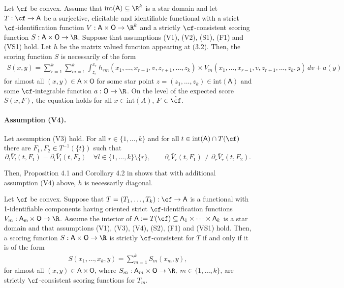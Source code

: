 \begin{prop}
Let $\cf$ be convex. Assume that $\mathrm{int}(\mathsf{A}) \subseteq \R^k$ is a star domain and let $T: \cf \to \mathsf{A}$ be a surjective, elicitable and identifiable functional with a strict $\cf$-identification function $V: \mathsf{A} \times \mathsf{O} \to \R^k$ and a strictly $\cf$-consistent scoring function $S: \mathsf{A} \times \mathsf{O} \to \R$. Suppose that assumptions (V1), (V2), (S1), (F1) and (VS1) hold. Let $h$ be the matrix valued function appearing at (3.2). Then, the scoring function $S$ is necessarily of the form
\begin{align}
S(x, y) = \sum_{r=1}^{k} \sum_{m=1}^{k} \int_{z_r}^{x_r} h_{rm}(x_1, \ldots, x_{r-1}, v, z_{r+1}, \ldots, z_k) \times V_m(x_1, \ldots, x_{r-1}, v, z_{r+1}, \ldots, z_k, y) \, dv + a(y)
\end{align}
for almost all $(x, y) \in \mathsf{A} \times \mathsf{O}$ for some star point $z = (z_1, \ldots, z_k) \in \mathrm{int}(\mathsf{A})$ and some $\cf$-integrable function $a: \mathsf{O} \to \R$. On the level of the expected score $\bar{S}(x, F)$, the equation holds for all $x \in \mathrm{int}(A)$, $F \in \hat{\cf}$.
\end{prop}

\paragraph{Assumption (V4).} Let assumption (V3) hold. For all $r \in \{1, \ldots, k\}$ and for all $t \in \mathrm{int}(\mathsf{A}) \cap T(\cf)$ there are $F_1, F_2 \in T^{-1}(\{t\})$ such that
\[
\partial_l \bar{V}_l(t, F_1) = \partial_l \bar{V}_l(t, F_2) \quad \forall l \in \{1, \ldots, k\} \setminus \{r\}, \qquad \partial_r \bar{V}_r(t, F_1) \neq \partial_r \bar{V}_r(t, F_2).
\]

Then, Proposition 4.1 and Corollary 4.2 in \cite{fissler2016multiq} shows that with additional assumption (V4) above, $h$ is necessarily diagonal.
\begin{theorem}
Let $\cf$ be convex. Suppose that $T = (T_1, \ldots, T_k): \cf \to \mathsf{A}$ is a functional with 1-identifiable components having oriented strict $\cf$-identification functions $V_m: \mathsf{A_m} \times \mathsf{O} \to \R$. Assume the interior of $\mathsf{A}:=T(\cf) \subseteq \mathsf{A}_1 \times \cdots \times \mathsf{A}_k$ is a star domain and that assumptions (V1), (V3), (V4), (S2), (F1) and (VS1) hold. Then, a scoring function $S: \mathsf{A} \times \mathsf{O} \to \R$ is strictly $\cf$-consistent for $T$ if and only if it is of the form
\begin{align}
    S(x_1, \ldots, x_k, y) = \sum_{m=1}^{k} S_m(x_m, y),
\end{align}
for almost all $(x,y) \in \mathsf{A} \times \mathsf{O}$, where $S_m: \mathsf{A}_m \times \mathsf{O} \to \R$, $m \in \{1, \ldots, k\}$, are strictly $\cf$-consistent scoring functions for $T_m$.
\end{theorem}

